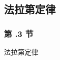\documentclass[aspectratio=2516]{beamer}
\begin{document}

\subsection{\kaishu 法拉第定律}


\begin{frame}
\frametitle{\kaishu  第 \uppercase\expandafter{}.3 节}
\begin{center}
	\Large \kaishu  法拉第定律
\end{center}

\end{frame}

\end{document}
